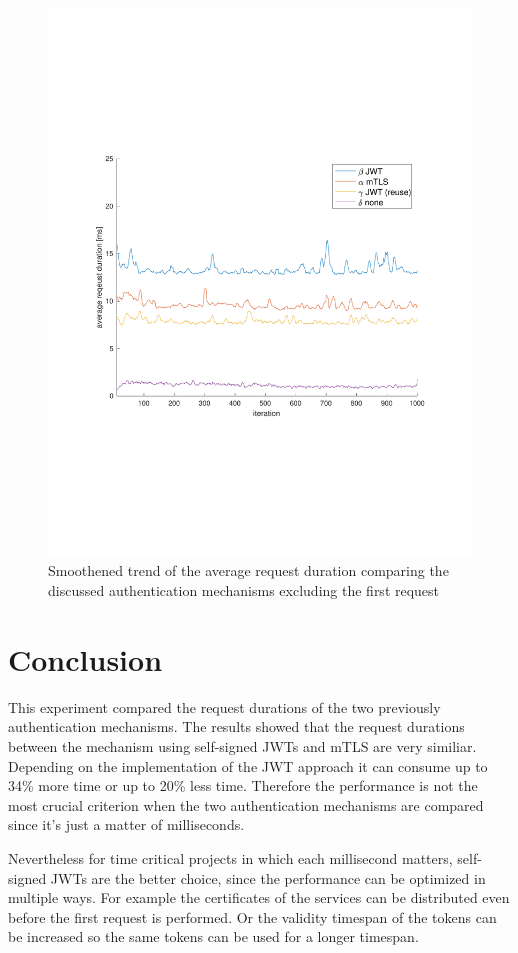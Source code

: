 \begin{figure}
	\centering
	\includegraphics[trim=0 200 0 200, clip, width=\textwidth]{images/experiment/experiment-trend.pdf}
	\caption{Smoothened trend of the average request duration comparing the discussed authentication mechanisms excluding the first request}
	\label{fig:trend}
\end{figure}

\section{Conclusion}
This experiment compared the request durations of the two previously authentication mechanisms.
The results showed that the request durations between the mechanism using self-signed JWTs and mTLS are very similiar.
Depending on the implementation of the JWT approach it can consume up to 34\% more time or up to 20\% less time.
Therefore the performance is not the most crucial criterion when the two authentication mechanisms are compared since it's just a matter of milliseconds. 

Nevertheless for time critical projects in which each millisecond matters, self-signed JWTs are the better choice, since the performance can be optimized in multiple ways.
For example the certificates of the services can be distributed even before the first request is performed.
Or the validity timespan of the tokens can be increased so the same tokens can be used for a longer timespan.
